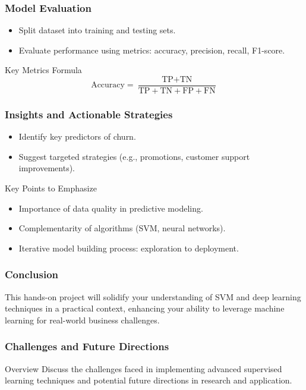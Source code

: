 \documentclass[aspectratio=169]{beamer}
\begin{document}
\begin{frame}[fragile]
    \frametitle{Model Evaluation}
    \begin{itemize}
        \item Split dataset into training and testing sets.
        \item Evaluate performance using metrics: accuracy, precision, recall, F1-score.
    \end{itemize}

    \begin{block}{Key Metrics Formula}
        \begin{equation}
        \text{Accuracy} = \frac{\text{TP} + \text{TN}}{\text{TP} + \text{TN} + \text{FP} + \text{FN}}
        \end{equation}
    \end{block}
\end{frame}

\begin{frame}[fragile]
    \frametitle{Insights and Actionable Strategies}
    \begin{itemize}
        \item Identify key predictors of churn.
        \item Suggest targeted strategies (e.g., promotions, customer support improvements).
    \end{itemize}
    
    \begin{block}{Key Points to Emphasize}
        \begin{itemize}
            \item Importance of data quality in predictive modeling.
            \item Complementarity of algorithms (SVM, neural networks).
            \item Iterative model building process: exploration to deployment.
        \end{itemize}
    \end{block}
\end{frame}

\begin{frame}[fragile]
    \frametitle{Conclusion}
    This hands-on project will solidify your understanding of SVM and deep learning techniques in a practical context, enhancing your ability to leverage machine learning for real-world business challenges.
\end{frame}

\begin{frame}[fragile]
    \frametitle{Challenges and Future Directions}
    \begin{block}{Overview}
        Discuss the challenges faced in implementing advanced supervised learning techniques and potential future directions in research and application.
    \end{block}
\end{frame}
\end{document}
